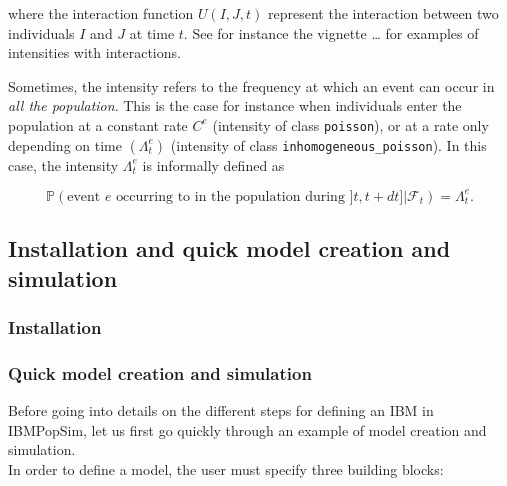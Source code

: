 where the interaction function \(U(I,J,t)\) represent the interaction between two individuals \(I\) and \(J\) at time \(t\). See for instance the vignette {\ldots{}} for examples of intensities with interactions.

Sometimes, the intensity refers to the frequency at which an event can occur in \emph{all the population}. This is the case for instance when individuals enter the population at a constant rate \(C^e\) (intensity of class \texttt{poisson}), or at a rate only depending on time \((\Lambda^e_t)\) (intensity of class \texttt{inhomogeneous\_poisson}). In this case, the intensity \(\Lambda^e_t\) is informally defined as

\begin{equation}
\mathbb{P}(\text{event } e \text{ occurring to in the population during } ]t,t+dt] | \mathcal{F}_t) = \Lambda^e_t.
\end{equation}

\hypertarget{installation-and-quick-model-creation-and-simulation}{%
\subsection{Installation and quick model creation and simulation}\label{installation-and-quick-model-creation-and-simulation}}

\hypertarget{installation}{%
\subsubsection{Installation}\label{installation}}

\begin{Shaded}
\begin{Highlighting}[]
\NormalTok{(}\NormalTok{)}

\end{Highlighting}
\end{Shaded}

\hypertarget{quick-model-creation-and-simulation}{%
\subsubsection{Quick model creation and simulation}\label{quick-model-creation-and-simulation}}

Before going into details on the different steps for defining an IBM in IBMPopSim, let us first go quickly through an example of model creation and simulation.\\
In order to define a model, the user must specify three building blocks:

